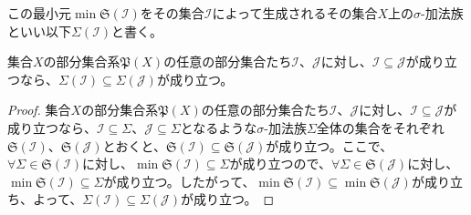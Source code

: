 \documentclass[dvipdfmx]{jsarticle}
\begin{document}
\begin{dfn}
この最小元$\min{\mathfrak{S}\left( \mathcal{I} \right)}$をその集合$\mathcal{I}$によって生成されるその集合$X$上の$\sigma$-加法族といい以下$\varSigma\left( \mathcal{I} \right)$と書く。
\end{dfn}
\begin{thm}\label{4.5.2.6}
集合$X$の部分集合系$\mathfrak{P}(X)$の任意の部分集合たち$\mathcal{I}$、$\mathcal{J}$に対し、$\mathcal{I \subseteq J}$が成り立つなら、$\varSigma\left( \mathcal{I} \right) \subseteq \varSigma\left( \mathcal{J} \right)$が成り立つ。
\end{thm}
\begin{proof}
集合$X$の部分集合系$\mathfrak{P}(X)$の任意の部分集合たち$\mathcal{I}$、$\mathcal{J}$に対し、$\mathcal{I \subseteq J}$が成り立つなら、$\mathcal{I \subseteq}\varSigma$、$\mathcal{J \subseteq}\varSigma$となるような$\sigma$-加法族$\varSigma$全体の集合をそれぞれ$\mathfrak{S}\left( \mathcal{I} \right)$、$\mathfrak{S}\left( \mathcal{J} \right)$とおくと、$\mathfrak{S}\left( \mathcal{I} \right)\subseteq \mathfrak{S}\left( \mathcal{J} \right)$が成り立つ。ここで、$\forall\varSigma \in \mathfrak{S}\left( \mathcal{I} \right)$に対し、$\min{\mathfrak{S}\left( \mathcal{I} \right)} \subseteq \varSigma$が成り立つので、$\forall\varSigma \in \mathfrak{S}\left( \mathcal{J} \right)$に対し、$\min{\mathfrak{S}\left( \mathcal{I} \right)} \subseteq \varSigma$が成り立つ。したがって、$\min{\mathfrak{S}\left( \mathcal{I} \right)} \subseteq \min{\mathfrak{S}\left( \mathcal{J} \right)}$が成り立ち、よって、$\varSigma\left( \mathcal{I} \right) \subseteq \varSigma\left( \mathcal{J} \right)$が成り立つ。
\end{proof}
\end{document}
